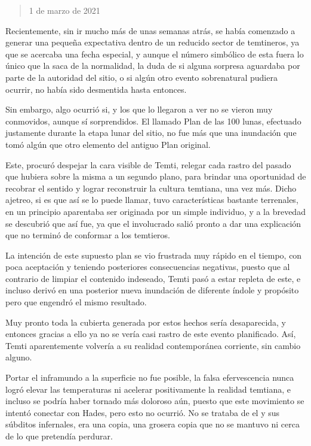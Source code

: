 \documentclass[
  spanish,
]{book}
\begin{document}
\begin{quote}
1 de marzo de 2021
\end{quote}

Recientemente, sin ir mucho más de unas semanas atrás, se había comenzado a generar una pequeña expectativa dentro de un reducido sector de temtineros, ya que se acercaba una fecha especial, y aunque el número simbólico de esta fuera lo único que la saca de la normalidad, la duda de si alguna sorpresa aguardaba por parte de la autoridad del sitio, o si algún otro evento sobrenatural pudiera ocurrir, no había sido desmentida hasta entonces.

Sin embargo, algo ocurrió si, y los que lo llegaron a ver no se vieron muy conmovidos, aunque sí sorprendidos. El llamado Plan de las 100 lunas, efectuado justamente durante la etapa lunar del sitio, no fue más que una inundación que tomó algún que otro elemento del antiguo Plan original.

Este, procuró despejar la cara visible de Temti, relegar cada rastro del pasado que hubiera sobre la misma a un segundo plano, para brindar una oportunidad de recobrar el sentido y lograr reconstruir la cultura temtiana, una vez más. Dicho ajetreo, si es que así se lo puede llamar, tuvo características bastante terrenales, en un principio aparentaba ser originada por un simple individuo, y a la brevedad se descubrió que así fue, ya que el involucrado salió pronto a dar una explicación que no terminó de conformar a los temtieros.

La intención de este supuesto plan se vio frustrada muy rápido en el tiempo, con poca aceptación y teniendo posteriores consecuencias negativas, puesto que al contrario de limpiar el contenido indeseado, Temti pasó a estar repleta de este, e incluso derivó en una posterior nueva inundación de diferente índole y propósito pero que engendró el mismo resultado.

Muy pronto toda la cubierta generada por estos hechos sería desaparecida, y entonces gracias a ello ya no se vería casi rastro de este evento planificado. Así, Temti aparentemente volvería a su realidad contemporánea corriente, sin cambio alguno.

Portar el inframundo a la superficie no fue posible, la falsa efervescencia nunca logró elevar las temperaturas ni acelerar positivamente la realidad temtiana, e incluso se podría haber tornado más doloroso aún, puesto que este movimiento se intentó conectar con Hades, pero esto no ocurrió. No se trataba de el y sus súbditos infernales, era una copia, una grosera copia que no se mantuvo ni cerca de lo que pretendía perdurar.
\end{document}
